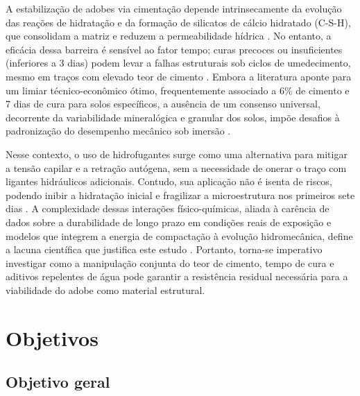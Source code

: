 
A estabilização de adobes via cimentação depende intrinsecamente da evolução das reações de hidratação e da formação de silicatos de cálcio hidratado (C-S-H), que consolidam a matriz e reduzem a permeabilidade hídrica \cite{Dao2018}. No entanto, a eficácia dessa barreira é sensível ao fator tempo; curas precoces ou insuficientes (inferiores a 3 dias) podem levar a falhas estruturais sob ciclos de umedecimento, mesmo em traços com elevado teor de cimento \cite{Wahabi2021, Nshimiyimana2020, Yang2024}. Embora a literatura aponte para um limiar técnico-econômico ótimo, frequentemente associado a 6\% de cimento e 7 dias de cura para solos específicos, a ausência de um consenso universal, decorrente da variabilidade mineralógica e granular dos solos, impõe desafios à padronização do desempenho mecânico sob imersão \cite{Abdallah2023, Wahabi2021}.

Nesse contexto, o uso de hidrofugantes surge como uma alternativa para mitigar a tensão capilar e a retração autógena, sem a necessidade de onerar o traço com ligantes hidráulicos adicionais. Contudo, sua aplicação não é isenta de riscos, podendo inibir a hidratação inicial e fragilizar a microestrutura nos primeiros sete dias \cite{Lu2023}. A complexidade dessas interações físico-químicas, aliada à carência de dados sobre a durabilidade de longo prazo em condições reais de exposição e modelos que integrem a energia de compactação à evolução hidromecânica, define a lacuna científica que justifica este estudo \cite{Abdallah2023, Jahandari2023, Rosicki2022}. Portanto, torna-se imperativo investigar como a manipulação conjunta do teor de cimento, tempo de cura e aditivos repelentes de água pode garantir a resistência residual necessária para a viabilidade do adobe como material estrutural.

\section{Objetivos}


\subsection{Objetivo geral}

